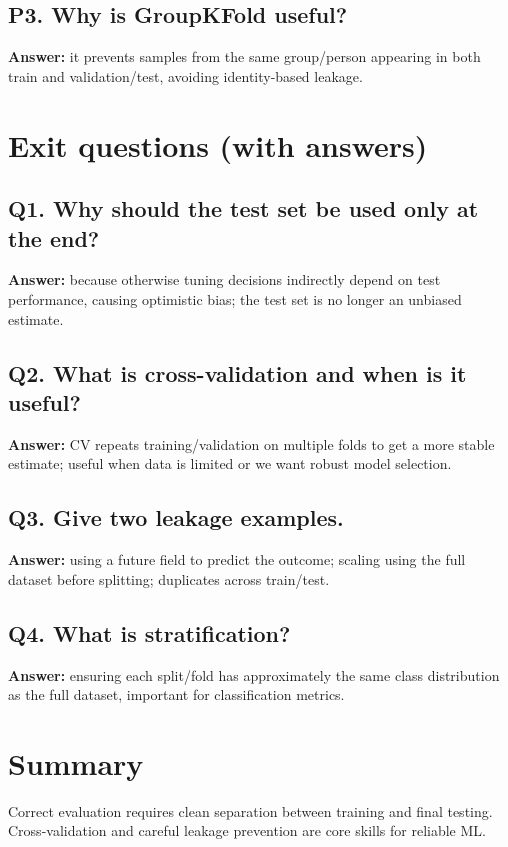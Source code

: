 \documentclass[11pt]{article}
\begin{document}
\subsection*{P3. Why is GroupKFold useful?}
\textbf{Answer:} it prevents samples from the same group/person appearing in both train and validation/test, avoiding identity-based leakage.

\section{Exit questions (with answers)}

\subsection*{Q1. Why should the test set be used only at the end?}
\textbf{Answer:} because otherwise tuning decisions indirectly depend on test performance, causing optimistic bias; the test set is no longer an unbiased estimate.

\subsection*{Q2. What is cross-validation and when is it useful?}
\textbf{Answer:} CV repeats training/validation on multiple folds to get a more stable estimate; useful when data is limited or we want robust model selection.

\subsection*{Q3. Give two leakage examples.}
\textbf{Answer:} using a future field to predict the outcome; scaling using the full dataset before splitting; duplicates across train/test.

\subsection*{Q4. What is stratification?}
\textbf{Answer:} ensuring each split/fold has approximately the same class distribution as the full dataset, important for classification metrics.

\section{Summary}
Correct evaluation requires clean separation between training and final testing. Cross-validation and careful leakage prevention are core skills for reliable ML.
\notesources{\AIMLUnitIIISources}
\end{document}
